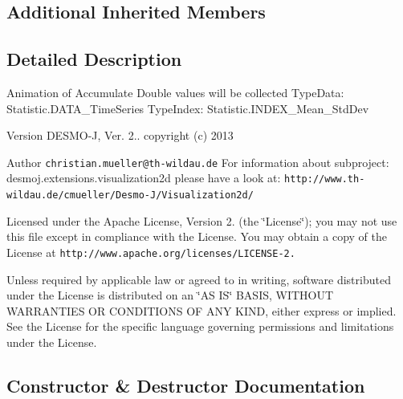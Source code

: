 \subsection*{Additional Inherited Members}


\subsection{Detailed Description}
Animation of Accumulate Double values will be collected Type\-Data\-: Statistic.\-D\-A\-T\-A\-\_\-\-Time\-Series Type\-Index\-: Statistic.\-I\-N\-D\-E\-X\-\_\-\-Mean\-\_\-\-Std\-Dev

\begin{DoxyVersion}{Version}
D\-E\-S\-M\-O-\/\-J, Ver. 2.. copyright (c) 2013 
\end{DoxyVersion}
\begin{DoxyAuthor}{Author}
{\tt christian.\-mueller@th-\/wildau.\-de} For information about subproject\-: desmoj.\-extensions.\-visualization2d please have a look at\-: {\tt http\-://www.\-th-\/wildau.\-de/cmueller/\-Desmo-\/\-J/\-Visualization2d/}
\end{DoxyAuthor}
Licensed under the Apache License, Version 2. (the \char`\"{}\-License\char`\"{}); you may not use this file except in compliance with the License. You may obtain a copy of the License at {\tt http\-://www.\-apache.\-org/licenses/\-L\-I\-C\-E\-N\-S\-E-\/2.}

Unless required by applicable law or agreed to in writing, software distributed under the License is distributed on an \char`\"{}\-A\-S I\-S\char`\"{} B\-A\-S\-I\-S, W\-I\-T\-H\-O\-U\-T W\-A\-R\-R\-A\-N\-T\-I\-E\-S O\-R C\-O\-N\-D\-I\-T\-I\-O\-N\-S O\-F A\-N\-Y K\-I\-N\-D, either express or implied. See the License for the specific language governing permissions and limitations under the License. 

\subsection{Constructor \& Destructor Documentation}
